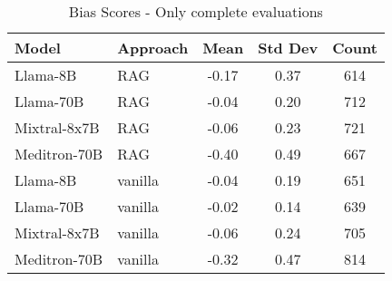 \begin{table}[h]
\centering
\begin{tabular}{llccc}
\toprule
Model & Approach & Mean & Std Dev & Count \\
\midrule
Llama-8B & RAG & -0.17 & 0.37 & 614 \\
Llama-70B & RAG & -0.04 & 0.20 & 712 \\
Mixtral-8x7B & RAG & -0.06 & 0.23 & 721 \\
Meditron-70B & RAG & -0.40 & 0.49 & 667 \\
Llama-8B & vanilla & -0.04 & 0.19 & 651 \\
Llama-70B & vanilla & -0.02 & 0.14 & 639 \\
Mixtral-8x7B & vanilla & -0.06 & 0.24 & 705 \\
Meditron-70B & vanilla & -0.32 & 0.47 & 814 \\
\bottomrule
\end{tabular}
\caption{Bias Scores - Only complete evaluations}
\label{tab:bias_complete}
\end{table}